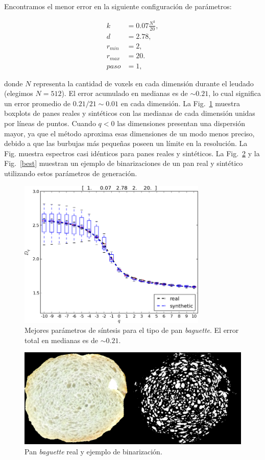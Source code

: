 Encontramos el menor error en la siguiente configuración de parámetros:

\begin{align*}
k &= 0.07 \frac{N^{3}}{20} ,\\
d &=2.78,\\
r_{min} &=2,\\
r_{max} &=20.\\
paso &=1,
\end{align*}

donde $N$ representa la cantidad de voxels en cada dimensión durante el leudado (elegimos $N = 512$). 
El error acumulado en medianas es de $\sim 0.21$, lo cual significa un error promedio de $0.21/21 \sim 0.01$ en cada dimensión.
La Fig.~\ref{bestboxplot} muestra boxplots de panes reales y sintéticos con las medianas de cada dimensión unidas por líneas de puntos.
Cuando $q < 0$ las dimensiones presentan una dispersión mayor, ya que el método aproxima esas dimensiones de un modo menos preciso, debido a que las burbujas más pequeñas poseen un límite en la resolución.
La Fig. muestra espectros casi idénticos para panes reales y sintéticos.
La Fig.~\ref{realbin} y la Fig.~\ref{best} muestran un ejemplo de binarizaciones de un pan real y sintético utilizando estos parámetros de generación.


\begin{figure}[!ht]
\includegraphics[width=9cm]{figures/bestboxplot}
\caption[Mejores parámetros de síntesis para el tipo de pan {\em baguette}]{Mejores parámetros de síntesis para el tipo de pan {\em baguette}. El error total en medianas es de $\sim 0.21$.}
\label{bestboxplot}
\end{figure}

\begin{figure}[!ht]
\begin{center}
\includegraphics[width=13cm]{figures/realbin}
\caption{ Pan {\em baguette} real y ejemplo de binarización.}
\label{realbin}
\end{center}
\end{figure}

